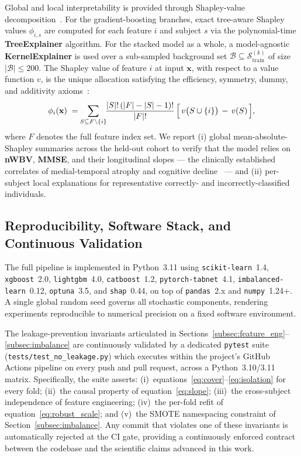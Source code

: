 Global and local interpretability is provided through Shapley-value decomposition~\cite{lundberg2020trees}. For the gradient-boosting branches, exact tree-aware Shapley values $\phi_{i,s}$ are computed for each feature $i$ and subject $s$ via the polynomial-time \textbf{TreeExplainer} algorithm. For the stacked model as a whole, a model-agnostic \textbf{KernelExplainer} is used over a sub-sampled background set $\mathcal{B} \subseteq \mathcal{S}_\mathrm{train}^{(k)}$ of size $|\mathcal{B}| \le 200$. The Shapley value of feature $i$ at input $\mathbf{x}$, with respect to a value function $v$, is the unique allocation satisfying the efficiency, symmetry, dummy, and additivity axioms~\cite{shapley1953}:
\begin{equation}
\phi_i(\mathbf{x}) \;=\; \!\!\sum_{S \subseteq F \setminus \{i\}}\!\! \frac{|S|!\,(|F| - |S| - 1)!}{|F|!}\,\Bigl[\, v\bigl(S \cup \{i\}\bigr) \,-\, v(S) \,\Bigr],
\label{eq:shapley}
\end{equation}
where $F$ denotes the full feature index set. We report (i) global mean-absolute-Shapley summaries across the held-out cohort to verify that the model relies on \textbf{nWBV}, \textbf{MMSE}, and their longitudinal slopes --- the clinically established correlates of medial-temporal atrophy and cognitive decline~\cite{frisoni2010,desikan2009} --- and (ii) per-subject local explanations for representative correctly- and incorrectly-classified individuals.

\subsection{Reproducibility, Software Stack, and Continuous Validation}
\label{subsec:repro}

The full pipeline is implemented in Python~3.11 using \texttt{scikit-learn}~1.4, \texttt{xgboost}~2.0, \texttt{lightgbm}~4.0, \texttt{catboost}~1.2, \texttt{pytorch-tabnet}~4.1, \texttt{imbalanced-learn}~0.12, \texttt{optuna}~3.5, and \texttt{shap}~0.44, on top of \texttt{pandas}~2.x and \texttt{numpy}~1.24+. A single global random seed governs all stochastic components, rendering experiments reproducible to numerical precision on a fixed software environment.

The leakage-prevention invariants articulated in Sections~\ref{subsec:feature_eng}--\ref{subsec:imbalance} are continuously validated by a dedicated \texttt{pytest} suite (\texttt{tests/test\_no\_leakage.py}) which executes within the project's GitHub Actions pipeline on every push and pull request, across a Python~3.10/3.11 matrix. Specifically, the suite asserts: (i)~equations~\eqref{eq:cover}--\eqref{eq:isolation} for every fold; (ii)~the causal property of equation~\eqref{eq:slope}; (iii)~the cross-subject independence of feature engineering; (iv)~the per-fold refit of equation~\eqref{eq:robust_scale}; and (v)~the SMOTE namespacing constraint of Section~\ref{subsec:imbalance}. Any commit that violates one of these invariants is automatically rejected at the CI gate, providing a continuously enforced contract between the codebase and the scientific claims advanced in this work.
